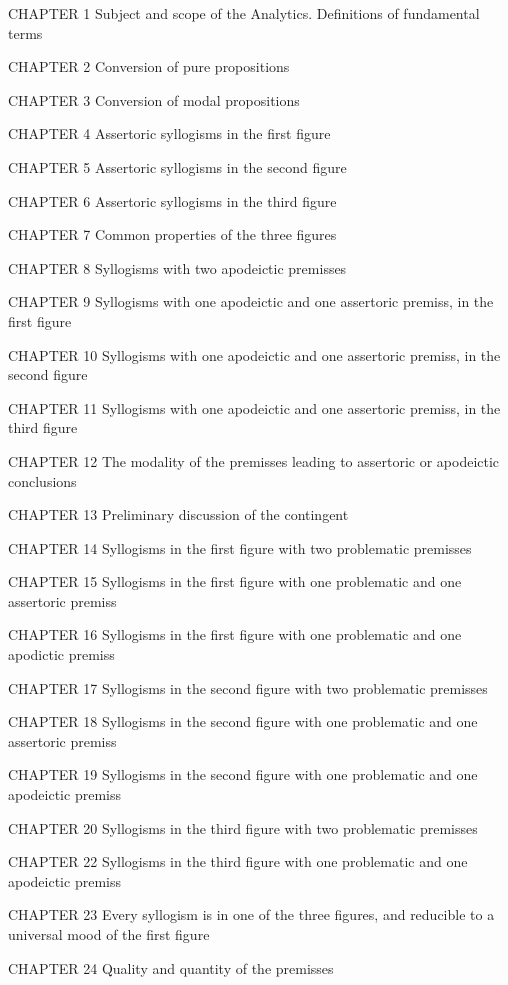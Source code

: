 CHAPTER 1
Subject and scope of the Analytics. Definitions of fundamental terms

CHAPTER 2
Conversion of pure propositions

CHAPTER 3
Conversion of modal propositions

CHAPTER 4
Assertoric syllogisms in the first figure

CHAPTER 5
Assertoric syllogisms in the second figure

CHAPTER 6
Assertoric syllogisms in the third figure

CHAPTER 7
Common properties of the three figures

CHAPTER 8
Syllogisms with two apodeictic premisses

CHAPTER 9
Syllogisms with one apodeictic and one assertoric premiss, in the
first figure

CHAPTER 10
Syllogisms with one apodeictic and one assertoric premiss, in the
second figure

CHAPTER 11
Syllogisms with one apodeictic and one assertoric premiss, in the
third figure

CHAPTER 12
The modality of the premisses leading to assertoric or apodeictic
conclusions

CHAPTER 13
Preliminary discussion of the contingent

CHAPTER 14
Syllogisms in the first figure with two problematic premisses

CHAPTER 15
Syllogisms in the first figure with one problematic and one assertoric
premiss

CHAPTER 16
Syllogisms in the first figure with one problematic and one apodictic
premiss

CHAPTER 17
Syllogisms in the second figure with two problematic premisses

CHAPTER 18
Syllogisms in the second figure with one problematic and one assertoric
premiss

CHAPTER 19
Syllogisms in the second figure with one problematic and one
apodeictic premiss

CHAPTER 20
Syllogisms in the third figure with two problematic premisses

CHAPTER 22
Syllogisms in the third figure with one problematic and one apodeictic
premiss

CHAPTER 23
Every syllogism is in one of the three figures, and reducible to a
universal mood of the first figure

CHAPTER 24
Quality and quantity of the premisses


